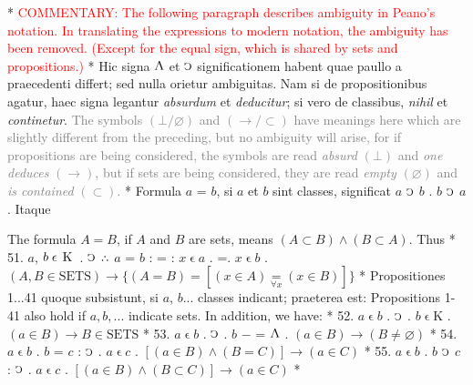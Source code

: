 \documentclass{book}
\newcommand{\C}{\mathop{\sbox0{$\displaystyle$$\reflectbox{C}$} %
\raisebox{-\height+\ht0-0.05cm}[\ht0][\dp0]{\scalebox{0.8}[0.8]{\copy0}}}\displaylimits} %
\newcommand{\pppNoSpace}{\leavevmode\lower0ex\hbox{.}\kern-0.1em\raise0.7ex\hbox{.}\kern-0.1em\lower0ex\hbox{.}} %
\newcommand{\abs}{\mathop{\rotatebox[origin=c]{180}{V}}}
\newcommand{\smallIn}{\ensuremath{\mathrel{\epsilon}}}
\newcommand{\K}{\mathop{\thinspace \text{K} \thinspace}}
\newcommand{\setOfSets}{\mathord{\text{SETS}}}
\newcommand\irrelavent[1]{\textcolor{gray}{#1}}
\newcommand\commentary[1]{\textcolor{red}{COMMENTARY: #1}}
\newenvironment{translateTwoCol}
               { %
                 \columnratio{0.5, 0.5} \begin{paracol}{2}
                 \newcommand{\LAT}{\switchcolumn[0]*}
                 \newcommand{\ENG}{\switchcolumn[1]}
               }
               { %
                 \let\ENG\undefined
                 \let\LAT\undefined
                 \end{paracol}
               }
\begin{document}
\begin{translateTwoCol}
\LAT
\ENG
\commentary{The following paragraph describes ambiguity in Peano's notation.  In translating the expressions to modern notation, the ambiguity has been removed.  (Except for the equal sign, which is shared by sets and propositions.) }
\LAT
Hic signa $\abs$ et $\C$ significationem habent quae paullo a praecedenti differt; sed nulla orietur ambiguitas. Nam si de propositionibus agatur, haec signa legantur {\emph{absurdum}} et {\emph{deducitur}}; si vero de classibus, {\emph{nihil}} et {\emph{continetur}}.
\ENG
\irrelavent{The symbols $(\bot / \varnothing)$ and $(\rightarrow / \subset)$ have meanings here which are slightly different from the preceding, but no ambiguity will arise, for if propositions are being considered, the symbols are read \emph{absurd} $(\bot)$ and \emph{one deduces} $(\rightarrow)$, but if sets are being considered, they are read \emph{empty} $(\varnothing)$ and \emph{is contained} $(\subset)$.}
\LAT
\quad Formula $a$ = $b$, si $a$ et $b$ sint classes, significat $a$ $\C$ $b$ . $b$ $\C$ $a$. Itaque
\ENG
\raggedright
\quad The formula $A = B$, if $A$ and $B$ are sets, means $(A \subset B) \wedge (B \subset A)$. Thus
\LAT
51. \hspace{0.67cm} $a$, $b \smallIn \K$ . $\C$ $\pppNoSpace$ $a$ = $b$ : = : $x \smallIn a$ . =\scalebox{0.7}{$x$}\thinspace . $x \smallIn b$
\ENG
51. \hspace{0.67cm} $(A, B \in \setOfSets) \rightarrow \{(A = B) = [(x \in A) \underset{\forall x}=  (x \in B)]\}$
\LAT
Propositiones 1...41 quoque subsistunt, si $a$, $b$... classes indicant; praeterea est:
\ENG
Propositions 1-41 also hold if $a,b,...$ indicate sets. In addition, we have:
\LAT
52. \hspace{0.67cm} $a\smallIn b$ . $\C$ . $b \smallIn \text{K}$
\ENG
52. \hspace{0.67cm} $(a \in B) \rightarrow B \in \setOfSets$
\LAT
53. \hspace{0.67cm} $a\smallIn b$ . $\C$ . $b$ $-$ = $\abs$
\ENG
53. \hspace{0.67cm} $(a \in B) \rightarrow (B \not= \varnothing)$
\LAT
54. \hspace{0.67cm} $a \smallIn b$ . $b$ = $c$ : $\C$ . $a \smallIn c$
\ENG
54. \hspace{0.67cm} $[(a \in B) \wedge (B = C)] \rightarrow (a \in C)$
\LAT
55. \hspace{0.67cm} $a \smallIn b$ . $b$ $\C$ $c$ : $\C$ . $a \smallIn c$
\ENG
55. \hspace{0.67cm} $[(a \in B) \wedge (B \subset C)] \rightarrow (a \in C)$
\LAT
\ENG

\end{translateTwoCol}
\end{document}

